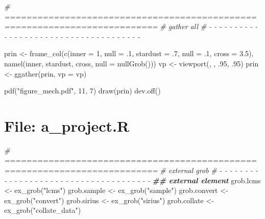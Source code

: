 \documentclass[
]{article}
\newenvironment{Shaded}{\begin{snugshade}}{\end{snugshade}}
\newcommand{\AttributeTok}[1]{\textcolor[rgb]{0.77,0.63,0.00}{#1}}
\newcommand{\CommentTok}[1]{\textcolor[rgb]{0.56,0.35,0.01}{\textit{#1}}}
\newcommand{\DecValTok}[1]{\textcolor[rgb]{0.00,0.00,0.81}{#1}}
\newcommand{\DocumentationTok}[1]{\textcolor[rgb]{0.56,0.35,0.01}{\textbf{\textit{#1}}}}
\newcommand{\FloatTok}[1]{\textcolor[rgb]{0.00,0.00,0.81}{#1}}
\newcommand{\FunctionTok}[1]{\textcolor[rgb]{0.00,0.00,0.00}{#1}}
\newcommand{\NormalTok}[1]{#1}
\newcommand{\OtherTok}[1]{\textcolor[rgb]{0.56,0.35,0.01}{#1}}
\newcommand{\StringTok}[1]{\textcolor[rgb]{0.31,0.60,0.02}{#1}}
\begin{document}
\begin{Shaded}
\begin{Highlighting}[]
\CommentTok{\# ==========================================================================}
\CommentTok{\# gather all}
\CommentTok{\# {-} {-} {-} {-} {-} {-} {-} {-} {-} {-} {-} {-} {-} {-} {-} {-} {-} {-} {-} {-} {-} {-} {-} {-} {-} {-} {-} {-} {-} {-} {-} {-} {-} {-} {-} {-} {-}}

\NormalTok{prin }\OtherTok{\textless{}{-}} \FunctionTok{frame\_col}\NormalTok{(}\FunctionTok{c}\NormalTok{(}\AttributeTok{inner =} \DecValTok{1}\NormalTok{, }\AttributeTok{null =}\NormalTok{ .}\DecValTok{1}\NormalTok{, }\AttributeTok{stardust =}\NormalTok{ .}\DecValTok{7}\NormalTok{, }\AttributeTok{null =}\NormalTok{ .}\DecValTok{1}\NormalTok{, }\AttributeTok{cross =} \FloatTok{3.5}\NormalTok{),}
                  \FunctionTok{namel}\NormalTok{(inner, stardust, cross, }\AttributeTok{null =} \FunctionTok{nullGrob}\NormalTok{()))}
\NormalTok{vp }\OtherTok{\textless{}{-}} \FunctionTok{viewport}\NormalTok{(, , .}\DecValTok{95}\NormalTok{, .}\DecValTok{95}\NormalTok{)}
\NormalTok{prin }\OtherTok{\textless{}{-}} \FunctionTok{ggather}\NormalTok{(prin, }\AttributeTok{vp =}\NormalTok{ vp)}

\FunctionTok{pdf}\NormalTok{(}\StringTok{"figure\_mech.pdf"}\NormalTok{, }\DecValTok{11}\NormalTok{, }\DecValTok{7}\NormalTok{)}
\FunctionTok{draw}\NormalTok{(prin)}
\FunctionTok{dev.off}\NormalTok{()}
\end{Highlighting}
\end{Shaded}

\hypertarget{file-a_project.r}{%
\section{File: a\_project.R}\label{file-a_project.r}}

\begin{Shaded}
\begin{Highlighting}[]
\CommentTok{\# ==========================================================================}
\CommentTok{\# external grob}
\CommentTok{\# {-} {-} {-} {-} {-} {-} {-} {-} {-} {-} {-} {-} {-} {-} {-} {-} {-} {-} {-} {-} {-} {-} {-} {-} {-} {-} {-} {-} {-} {-} {-} {-} {-} {-} {-} {-} {-}}
\DocumentationTok{\#\# external element}
\NormalTok{grob.lcms }\OtherTok{\textless{}{-}} \FunctionTok{ex\_grob}\NormalTok{(}\StringTok{"lcms"}\NormalTok{)}
\NormalTok{grob.sample }\OtherTok{\textless{}{-}} \FunctionTok{ex\_grob}\NormalTok{(}\StringTok{"sample"}\NormalTok{)}
\NormalTok{grob.convert }\OtherTok{\textless{}{-}} \FunctionTok{ex\_grob}\NormalTok{(}\StringTok{"convert"}\NormalTok{)}
\NormalTok{grob.sirius }\OtherTok{\textless{}{-}} \FunctionTok{ex\_grob}\NormalTok{(}\StringTok{"sirius"}\NormalTok{)}
\NormalTok{grob.collate }\OtherTok{\textless{}{-}} \FunctionTok{ex\_grob}\NormalTok{(}\StringTok{"collate\_data"}\NormalTok{)}
\end{Highlighting}
\end{Shaded}
\end{document}
